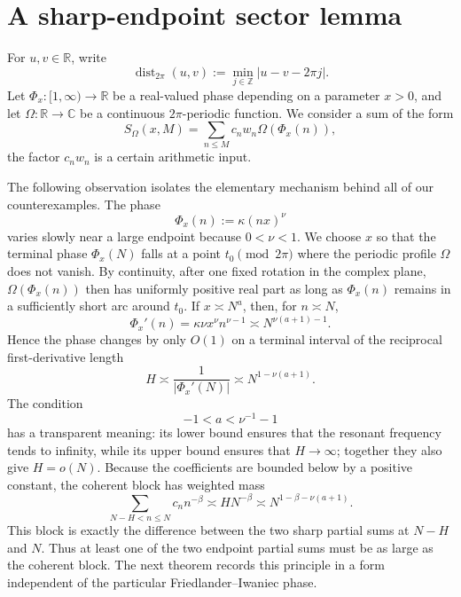 \documentclass[11pt]{amsart}
\theoremstyle{plain}
\theoremstyle{definition}
\theoremstyle{remark}
\numberwithin{equation}{section}
\begin{document}
\section{A sharp-endpoint sector lemma}\label{sec:sector}


For $u,v\in\mathbb R$, write
\[
  \operatorname{dist}_{2\pi}(u,v)
  :=
  \min_{j\in\mathbb Z}|u-v-2\pi j|.
\]
Let $\Phi_x:[1,\infty)\to\mathbb R$ be a real-valued phase depending
on a parameter $x>0$, and let
$\Omega:\mathbb R\to\mathbb C$ be a continuous
$2\pi$-periodic function. We consider a sum of the
form
\[
  S_\Omega(x,M)
  =
  \sum_{n\le M}c_nw_n\Omega(\Phi_x(n)),
\]
the factor $c_nw_n$ is a certain arithmetic input.

The following observation isolates the elementary mechanism behind all of our counterexamples. The phase \[ \Phi_x(n):=\kappa(nx)^\nu \] varies slowly near a large endpoint because \(0<\nu<1\). We choose \(x\) so that the terminal phase \(\Phi_x(N)\) falls at a point \(t_0\pmod{2\pi}\) where the periodic profile \(\Omega\) does not vanish. By continuity, after one fixed rotation in the complex plane, \(\Omega(\Phi_x(n))\) then has uniformly positive real part as long as \(\Phi_x(n)\) remains in a sufficiently short arc around \(t_0\). If \(x\asymp N^a\), then, for \(n\asymp N\), \[ \Phi_x'(n) =\kappa\nu x^\nu n^{\nu-1} \asymp N^{\nu(a+1)-1}. \] Hence the phase changes by only \(O(1)\) on a terminal interval of the reciprocal first-derivative length \[ H\asymp \frac{1}{|\Phi_x'(N)|} \asymp N^{1-\nu(a+1)}. \] The condition \[ -1<a<\nu^{-1}-1 \] has a transparent meaning: its lower bound ensures that the resonant frequency tends to infinity, while its upper bound ensures that \(H\to\infty\); together they also give \(H=o(N)\). Because the coefficients are bounded below by a positive constant, the coherent block has weighted mass \[ \sum_{N-H<n\le N}c_n n^{-\beta} \asymp HN^{-\beta} \asymp N^{1-\beta-\nu(a+1)}. \] This block is exactly the difference between the two sharp partial sums at \(N-H\) and \(N\). Thus at least one of the two endpoint partial sums must be as large as the coherent block. The next theorem records this principle in a form independent of the particular Friedlander--Iwaniec phase.
\end{document}
